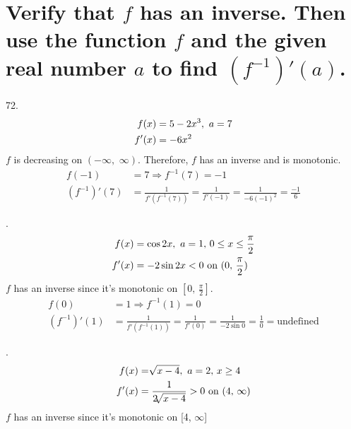 \documentclass[11pt]{article}
\newcommand*{\vs}{\vspace{1cm}}
\newcommand*{\next}{\noindent}
\newcommand*{\set}{\setcounter{equation}{0}}
\begin{document}
\section{Verify that $f$ has an inverse. Then use the function $f$ and the given real number $a$ to find $(f^{-1})'(a)$.}
72.\begin{align}
    \set
    f(x)&=5-2x^3,\,\, a=7\\
    f'(x)&=-6x^2
\end{align}
$f$ is decreasing on $(-\infty,\,\,\infty)$. Therefore, $f$ has an inverse and is monotonic.\\
\begin{align}
    f(-1)&=7\Rightarrow f^{-1}(7)=-1\\
    (f^{-1})'(7)&=\frac{1}{f'(f^{-1}(7))}=\frac{1}{f'(-1)}=\frac{1}{-6(-1)^2}=\frac{-1}{6}
\end{align}

\vs\next
76.\begin{align}
    \set
    f(x)&=\cos 2x,\,\, a=1,\,0\leq x\leq\frac{\pi}{2}\\
    f'(x)&=-2\sin 2x<0\,\,\text{on}\,\, (0,\,\frac{\pi}{2})
\end{align}
$f$ has an inverse since it's monotonic on $[0,\,\frac{\pi}{2}]$.
\begin{align}
    f(0)&=1\Rightarrow f^{-1}(1)=0\\
    (f^{-1})'(1)&=\frac{1}{f'(f^{-1}(1))}=\frac{1}{f'(0)}=\frac{1}{-2\sin 0}=\frac{1}{0}=\text{undefined}
\end{align}

\vs\next
80.\begin{align}
    \set
    f(x)&=\sqrt[]{x-4},\,\, a=2,\, x\geq 4\\
    f'(x)&=\frac{1}{2\sqrt[]{x-4}}>0\,\,\text{on}\,\, (4,\,\infty)
\end{align}
$f$ has an inverse since it's monotonic on [4, $\infty$]
\end{document}
